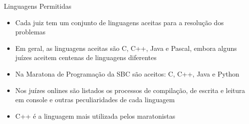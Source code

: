 \begin{frame}[fragile]{Linguagens Permitidas}

    \begin{itemize}
        \item  Cada  juiz tem um conjunto de linguagens aceitas para a resolução dos problemas
        \item Em geral, as linguagens aceitas são C, C++, Java e Pascal, embora alguns juízes aceitem centenas de linguagens diferentes
        \item Na Maratona de Programação da SBC são aceitos: C, C++, Java e Python
        \item Nos juízes onlines são listados os processos de compilação, de escrita e leitura em 
        console e outras peculiaridades de cada linguagem
        \item C++ é a linguagem mais utilizada pelos maratonistas
    \end{itemize}

\end{frame}
